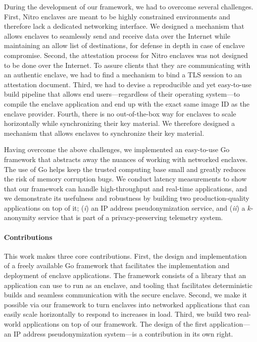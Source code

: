 During the development of our framework, we had to overcome several challenges.
First, Nitro enclaves are meant to be highly constrained environments and
therefore lack a dedicated networking interface.  We designed a mechanism that
allows enclaves to seamlessly send and receive data over the Internet while
maintaining an allow list of destinations, for defense in depth in case of
enclave compromise.
%
Second, the attestation process for Nitro enclaves was not designed to be done
over the Internet.  To assure clients that they are communicating with an
authentic enclave, we had to find a mechanism to bind a TLS session to an
attestation document.
%
Third, we had to devise a reproducible and yet easy-to-use build pipeline that
allows end users---regardless of their operating system---to compile the enclave
application and end up with the exact same image ID as the enclave provider.
%
Fourth, there is no out-of-the-box way for enclaves to scale horizontally while
synchronizing their key material.  We therefore designed a mechanism that allows
enclaves to synchronize their key material.

Having overcome the above challenges, we implemented an easy-to-use Go framework
that abstracts away the nuances of working with networked enclaves.  The use of
Go helps keep the trusted computing base small and greatly reduces the risk of
memory corruption bugs.  We conduct latency measurements to show that our
framework can handle high-throughput and real-time applications, and we
demonstrate its usefulness and robustness by building two production-quality
applications on top of it; (\emph{i}) an IP address pseudonymization service,
and (\emph{ii}) a $k$-anonymity service that is part of a privacy-preserving
telemetry system.

\paragraph{Contributions}

This work makes three core contributions.
%
First, the design and implementation of a freely available Go framework that
facilitates the implementation and deployment of enclave applications.  The
framework consists of a library that an application can use to run as an
enclave, and tooling that facilitates deterministic builds and seamless
communication with the secure enclave.
%
Second, we make it possible via our framework to turn enclaves into networked
applications that can easily scale horizontally to respond to increases in load.
%
Third, we build two real-world applications on top of our framework.  The design
of the first application---an IP address pseudonymization system---is a
contribution in its own right.

